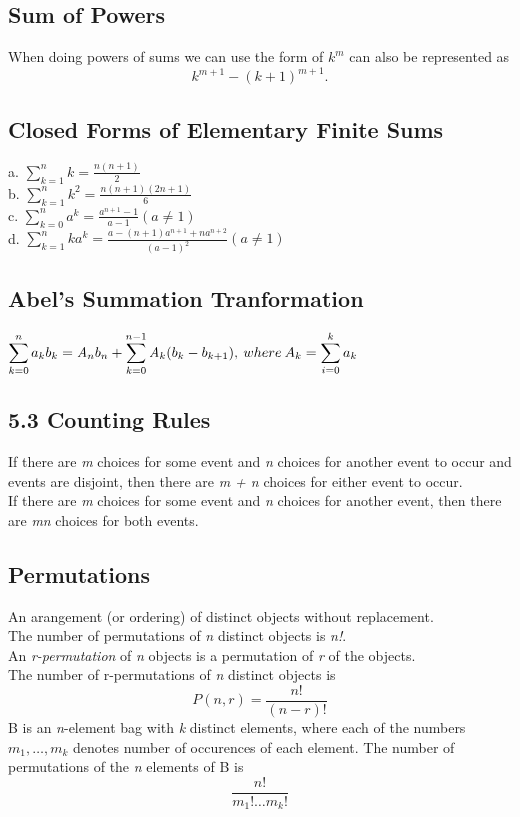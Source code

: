 \documentclass[10pt,twocolumn]{article}
\begin{document}
	\subsection*{Sum of Powers}
	When doing powers of sums we can use the form of $k^m$ can also be
	represented as \[k^{m+1} - ( k + 1)^{m+1}.\]

	\subsection*{Closed Forms of Elementary Finite Sums}
	a. $\displaystyle\sum_{k=1}^n k = \frac{n(n+1)}{2}$\\
	b. $\displaystyle\sum_{k=1}^n k^2 = \frac{n(n+1)(2n+1)}{6}$\\
	c. $\displaystyle\sum_{k=0}^n a^k = \frac{a^{n+1} - 1}{a -1} ( a \neq
	1)$\\
	d. $\displaystyle\sum_{k=1}^n ka^k = \frac{a - (n + 1)a^{n+1} +
	  na^{n+2}}{(a-1)^2} (a \neq 1)$\\

	\subsection*{Abel's Summation Tranformation}
	$\displaystyle\sum_{k=0}^n a_kb_k = \mathit{A}_nb_n + \sum_{k=0}^{n-1}
	\mathit{A}_k(b_k - b_{k+1}),\\
	  \:where\:A_k = \sum_{i=0}^k a_k$
	
	\subsection*{5.3 Counting Rules}
	If there are \textit{m} choices for some event and \textit{n}
        choices for another event to occur and events are disjoint,
        then there are \textit{m + n} choices for either event to occur. \\
	If there are \textit{m} choices for some event and \textit{n}
        choices for another event, then there are \textit{mn} choices
        for both events.
	\subsection*{Permutations}
	An arangement (or ordering) of distinct objects without replacement. \\
	The number of permutations of \textit{n} distinct objects is \textit{n!}. \\
	An \textit{r-permutation} of \textit{n} objects is a
        permutation of \textit{r} of the objects. \\
	The number of r-permutations of \textit{n} distinct objects is
	\[P(n, r)=\frac{n!}{(n - r)!}\]
	B is an \textit{n}-element bag with \textit{k} distinct
        elements, where each of the numbers $m_1,\ldots,m_k$ denotes
        number of occurences of each element.  The number of
        permutations of the \textit{n} elements of B is \[\frac{n!}{m_1! \ldots m_k!}\]
\end{document}
